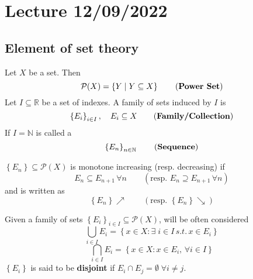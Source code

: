 \section{Lecture 12/09/2022}

\subsection*{Element of set theory}
Let \(X\) be a set. Then 
\[
    \mathcal{P}(X) = \left\lbrace Y \; | \; Y \subseteq X \right\rbrace \tag{\textbf{Power Set}}
\]
Let \(I \subseteq \mathbb{R}\) be a set of indexes. A family of sets induced by \(I\) is 
\[
    \left\lbrace E_i \right\rbrace_{i \in I}, \quad E_i \subseteq X  \tag{\textbf{Family/Collection}}
\]
If \(I = \mathbb{N} \) is called a 
\[
    \left\lbrace E_n \right\rbrace_{n \in \mathbb{N}} \tag{\textbf{Sequence}}
\]
\begin{definition}
    \( \left\lbrace E_n \right\rbrace \subseteq \mathcal{P}(X) \) is monotone increasing (resp. decreasing) if 
    \[
        E_n \subseteq E_{n+1} \,\forall n \qquad (\mbox{resp. } E_n \supseteq E_{n+1} \, \forall n)
    \]
    and is written as 
    \[
        \left\lbrace E_n \right\rbrace \nearrow \qquad (\mbox{resp. }\left\lbrace E_n \right\rbrace \searrow)
    \]
\end{definition}
Given a family of sets \(\left\lbrace E_i \right\rbrace_{i \in I} \subseteq \mathcal{P}(X)\), will be often considered
\[
    \bigcup_{i \in I} E_i = \left\lbrace x \in X : \exists \; i \in I \, s.t. \, x \in E_i \right\rbrace 
\]
\[
    \bigcap_{i \in I} E_i = \left\lbrace x \in X : x \in E_i, \, \forall i \in I \right\rbrace
\]
\(\left\lbrace E_i \right\rbrace\) is said to be \textbf{disjoint} if \(E_i \cap E_j = \emptyset \; \forall i \not = j\).

